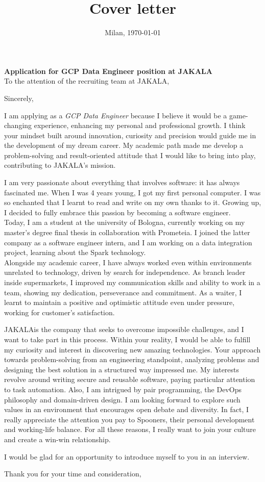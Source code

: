\documentclass[11pt,a4paper,roman]{moderncv}
\title{Cover letter}
\newcommand{\company}{JAKALA}
\newcommand{\position}{GCP Data Engineer}
\newcommand{\gap}{ }
\begin{document}
    \recipient{\company}{}
    \date{Milan, \today}

    \opening{\textbf{Application for \position\gap position at \company}
        \\
        \vspace{15pt}
        To the attention of the recruiting team at \company,
    }
    \closing{Sincerely,}

    \makelettertitle

    \justifying
    I am applying as a \textit{\position} because I believe it would be a game-changing experience, enhancing my personal and professional growth.
    I think your mindset built around innovation, curiosity and precision would guide me in the development of my dream career.
    My academic path made me develop a problem-solving and result-oriented attitude that I would like to bring into play, contributing to \company's mission.

    I am very passionate about everything that involves software: it has always fascinated me.
    When I was 4 years young, I got my first personal computer.
    I was so enchanted that I learnt to read and write on my own thanks to it.
    Growing up, I decided to fully embrace this passion by becoming a software engineer.
    \\
    Today, I am a student at the university of Bologna, currently working on my master's degree final thesis in collaboration with Prometeia.
    I joined the latter company as a software engineer intern, and I am working on a data integration project, learning about the Spark technology.
    \\
    Alongside my academic career, I have always worked even within environments unrelated to technology, driven by search for independence.
    As branch leader inside supermarkets, I improved my communication skills and ability to work in a team, showing my dedication, perseverance and commitment.
    As a waiter, I learnt to maintain a positive and optimistic attitude even under pressure, working for customer's satisfaction.

    \company is the company that seeks to overcome impossible challenges, and I want to take part in this process.
    Within your reality, I would be able to fulfill my curiosity and interest in discovering new amazing technologies.
    Your approach towards problem-solving from an engineering standpoint, analyzing problems and designing the best solution in a structured way impressed me.
    My interests revolve around writing secure and reusable software, paying particular attention to task automation.
    Also, I am intrigued by pair programming, the DevOps philosophy and domain-driven design.
    I am looking forward to explore such values in an environment that encourages open debate and diversity.
    In fact, I really appreciate the attention you pay to Spooners, their personal development and working-life balance.
    For all these reasons, I really want to join your culture and create a win-win relationship.

    I would be glad for an opportunity to introduce myself to you in an interview.

    \vspace{0.5cm}

    Thank you for your time and consideration,

    \makeletterclosing
\end{document}
